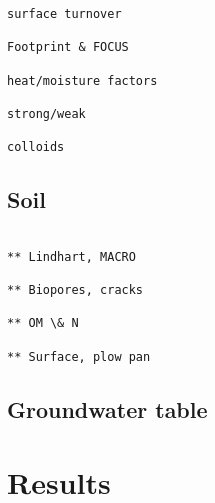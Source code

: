 \documentclass[a4paper]{article}
\begin{document}
\begin{text}
\begin{verbatim}
surface turnover

Footprint & FOCUS

heat/moisture factors

strong/weak

colloids

\end{verbatim}

\subsection{Soil}

\begin{verbatim}

** Lindhart, MACRO

** Biopores, cracks

** OM \& N

** Surface, plow pan
\end{verbatim}

\subsection{Groundwater table}

\section{Results}

\end{text}









\end{document}
